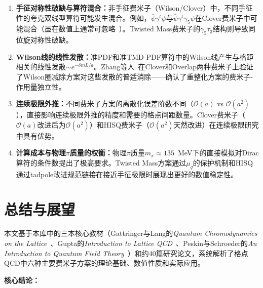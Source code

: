 \documentclass[12pt,a4paper]{ctexart}
\theoremstyle{definition}
\begin{document}
\begin{enumerate}[leftmargin=*]
    \item \textbf{手征对称性破缺与算符混合：}非手征费米子（Wilson/Clover）中，不同手征性的夸克双线型算符可能发生混合。例如，$\bar\psi\gamma^t\psi$与$\bar\psi\gamma^t\gamma_5\psi$在Clover费米子中可能混合（虽在数值上通常可忽略~\cite{Zhang2022renormTMD}）。Twisted Mass费米子的$\gamma_5\tau_3$结构则导致同位旋对称性破缺。

    \item \textbf{Wilson线的线性发散：}准PDF和准TMD-PDF算符中的Wilson线产生与格距相关的线性发散$\sim e^{-\delta m L/a}$。Zhang等人~\cite{Zhang2022renormTMD}在Clover和Overlap两种费米子上验证了Wilson圈减除方案对这些发散的普适消除——确认了重整化方案的费米子-作用量独立性。

    \item \textbf{连续极限外推：}不同费米子方案的离散化误差阶数不同（$\mathcal{O}(a)$ vs $\mathcal{O}(a^2)$），直接影响连续极限外推的精度和需要的格点间距数量。Clover费米子（$\mathcal{O}(a)$改进后为$\mathcal{O}(a^2)$）和HISQ费米子（$\mathcal{O}(a^2)$天然改进）在连续极限研究中具有优势。

    \item \textbf{计算成本与物理$\pi$质量的权衡：}物理$\pi$质量$m_\pi \approx 135$~MeV下的直接模拟对Dirac算符的条件数提出了极高要求。Twisted Mass方案通过$\mu_q$的保护机制和HISQ通过tadpole改进规范链接在接近手征极限时展现出更好的数值稳定性。
\end{enumerate}

\section{总结与展望}

本文基于本库中的三本核心教材（Gattringer与Lang的\textit{Quantum Chromodynamics on the Lattice}~\cite{GattringerLang2010}、Gupta的\textit{Introduction to Lattice QCD}~\cite{Gupta1997intro}、Peskin与Schroeder的\textit{An Introduction to Quantum Field Theory}~\cite{PeskinSchroeder1995}）和约40篇研究论文，系统解析了格点QCD中六种主要费米子方案的理论基础、数值性质和实际应用。

\textbf{核心结论：}
\end{document}
